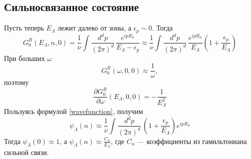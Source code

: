 \documentclass{article}
\begin{document}
\subsection{Сильносвязанное состояние}
Пусть теперь $E_\Lambda$ лежит далеко от зоны, а $\epsilon_p \sim 0$. Тогда
\begin{equation}
	G_0^R(E_\Lambda, n, 0) = 
	\frac{1}{\nu}
		\int \frac{d^d p}{(2\pi)^d}\, \frac{e^{ipR_n}}{E_\Lambda - \epsilon_p}
	\approx \frac{1}{\nu}\int \frac{d^d p}{(2\pi)^d}\, 
			\frac{e^{ipR_n}}{E_\Lambda}\left(1 + \frac{\epsilon_p}{E_\Lambda}\right)
\end{equation}
При больших $\omega$ 
\begin{equation}
	G_0^R(\omega,0,0) \approx \frac{1}{\omega},
\end{equation}
поэтому
\begin{equation}
	\frac{\partial G_0^R}{\partial \omega}(E_\Lambda, 0, 0) = -\frac{1}{E_\Lambda^2}
\end{equation}
Пользуясь формулой \ref{wavefunction}, получим
\begin{equation}
	\psi_\Lambda(n) \approx 
	\frac{1}{\nu}\int \frac{d^d p}{(2\pi)^d}\, 
			\left(1 + \frac{\epsilon_p}{E_\Lambda}\right)e^{ipR_n}
\end{equation}
Тогда $\psi_\Lambda(0) \approx 1$, а 
$\psi_\Lambda(n) \approx \frac{C_n}{E_\Lambda}$, где $C_n$ --- коэффициенты из гамильтониана 
сильной связи.
 
\end{document}
